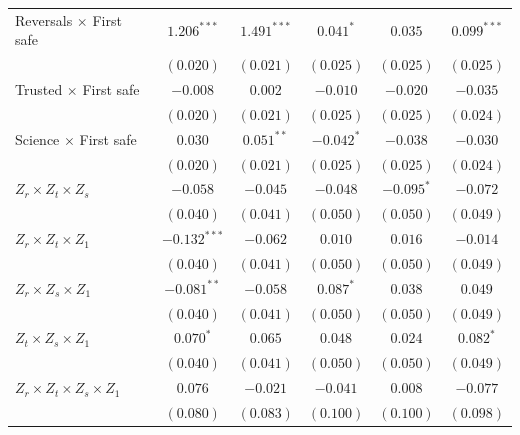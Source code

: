 \begin{table}
\begin{center}
\begin{tabular}{l c c || c c || c}
Reversals $\times$ First safe          & $1.206^{***}$  & $1.491^{***}$ & $0.041^{*}$    & $0.035$        & $0.099^{***}$ \\
                                       & $(0.020)$      & $(0.021)$     & $(0.025)$      & $(0.025)$      & $(0.025)$     \\
Trusted $\times$ First safe            & $-0.008$       & $0.002$       & $-0.010$       & $-0.020$       & $-0.035$      \\
                                       & $(0.020)$      & $(0.021)$     & $(0.025)$      & $(0.025)$      & $(0.024)$     \\
Science $\times$ First safe            & $0.030$        & $0.051^{**}$  & $-0.042^{*}$   & $-0.038$       & $-0.030$      \\
                                       & $(0.020)$      & $(0.021)$     & $(0.025)$      & $(0.025)$      & $(0.024)$     \\
$Z_r \times Z_t \times Z_s$            & $-0.058$       & $-0.045$      & $-0.048$       & $-0.095^{*}$   & $-0.072$      \\
                                       & $(0.040)$      & $(0.041)$     & $(0.050)$      & $(0.050)$      & $(0.049)$     \\
$Z_r \times Z_t \times Z_1$            & $-0.132^{***}$ & $-0.062$      & $0.010$        & $0.016$        & $-0.014$      \\
                                       & $(0.040)$      & $(0.041)$     & $(0.050)$      & $(0.050)$      & $(0.049)$     \\
$Z_r \times Z_s \times Z_1$            & $-0.081^{**}$  & $-0.058$      & $0.087^{*}$    & $0.038$        & $0.049$       \\
                                       & $(0.040)$      & $(0.041)$     & $(0.050)$      & $(0.050)$      & $(0.049)$     \\
$Z_t \times Z_s \times Z_1$            & $0.070^{*}$    & $0.065$       & $0.048$        & $0.024$        & $0.082^{*}$   \\
                                       & $(0.040)$      & $(0.041)$     & $(0.050)$      & $(0.050)$      & $(0.049)$     \\
$Z_r \times Z_t \times Z_s \times Z_1$ & $0.076$        & $-0.021$      & $-0.041$       & $0.008$        & $-0.077$      \\
                                       & $(0.080)$      & $(0.083)$     & $(0.100)$      & $(0.100)$      & $(0.098)$     \\

\end{tabular}
\end{center}
\end{table}
